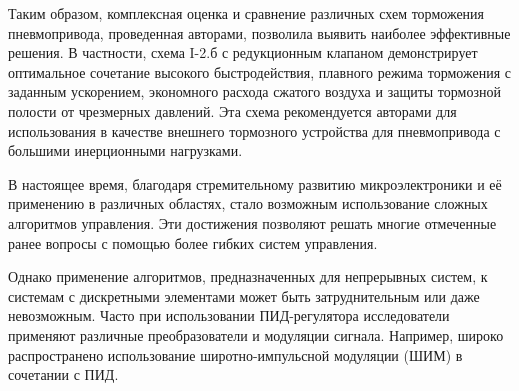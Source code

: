 Таким образом, комплексная оценка и сравнение различных схем торможения пневмопривода, проведенная авторами, позволила
выявить наиболее эффективные решения. В частности, схема I-2.б с редукционным клапаном демонстрирует оптимальное
сочетание высокого быстродействия, плавного режима торможения с заданным ускорением, экономного расхода сжатого
воздуха и защиты тормозной полости от чрезмерных давлений. Эта схема рекомендуется авторами для использования в качестве
внешнего тормозного устройства для пневмопривода с большими инерционными нагрузками.

В настоящее время, благодаря стремительному развитию микроэлектроники и её применению в различных
областях, стало возможным использование сложных алгоритмов управления. Эти достижения позволяют решать
многие отмеченные ранее вопросы с помощью более гибких систем управления.

Однако применение алгоритмов, предназначенных для непрерывных систем, к системам с
дискретными элементами может быть затруднительным или даже невозможным. Часто при использовании
ПИД-регулятора исследователи применяют различные преобразователи и модуляции сигнала. Например,
широко распространено использование широтно-импульсной модуляции (ШИМ) в сочетании с ПИД.
